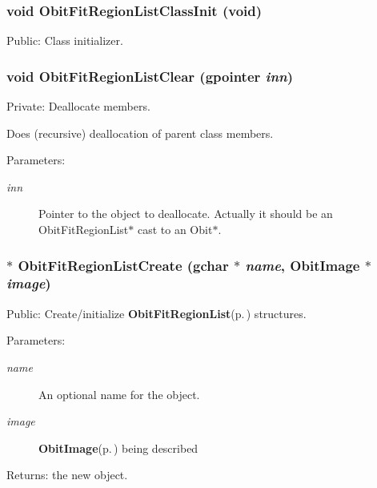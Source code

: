 \subsubsection{\setlength{\rightskip}{0pt plus 5cm}void Obit\-Fit\-Region\-List\-Class\-Init (void)}\label{ObitFitRegionList_8c_a13}


Public: Class initializer. 

\subsubsection{\setlength{\rightskip}{0pt plus 5cm}void Obit\-Fit\-Region\-List\-Clear (gpointer {\em inn})}\label{ObitFitRegionList_8c_a4}


Private: Deallocate members. 

Does (recursive) deallocation of parent class members. \begin{Desc}
\item[Parameters:]
\begin{description}
\item[{\em inn}]Pointer to the object to deallocate. Actually it should be an Obit\-Fit\-Region\-List$\ast$ cast to an Obit$\ast$. \end{description}
\end{Desc}
\subsubsection{$\ast$ Obit\-Fit\-Region\-List\-Create (gchar $\ast$ {\em name}, {\bf Obit\-Image} $\ast$ {\em image})}\label{ObitFitRegionList_8c_a8}


Public: Create/initialize {\bf Obit\-Fit\-Region\-List}{\rm (p.\,\pageref{structObitFitRegionList})} structures. 

\begin{Desc}
\item[Parameters:]
\begin{description}
\item[{\em name}]An optional name for the object. \item[{\em image}]{\bf Obit\-Image}{\rm (p.\,\pageref{structObitImage})} being described \end{description}
\end{Desc}
\begin{Desc}
\item[Returns:]the new object. \end{Desc}
